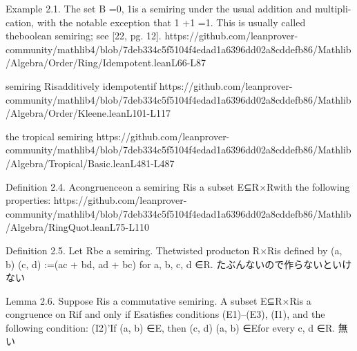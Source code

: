 %
\begin{example}
  Example 2.1. The set B ={0, 1}is a semiring under the usual addition and multipli-cation, with the notable exception that 1 +1 =1. This is usually called theboolean semiring; see [22, pg. 12].
https://github.com/leanprover-community/mathlib4/blob/7deb334c5f5104f4edad1a6396dd02a8cddefb86/Mathlib/Algebra/Order/Ring/Idempotent.leanL66-L87
\end{example}


semiring Risadditively idempotentif
https://github.com/leanprover-community/mathlib4/blob/7deb334c5f5104f4edad1a6396dd02a8cddefb86/Mathlib/Algebra/Order/Kleene.leanL101-L117



the tropical semiring
https://github.com/leanprover-community/mathlib4/blob/7deb334c5f5104f4edad1a6396dd02a8cddefb86/Mathlib/Algebra/Tropical/Basic.leanL481-L487



Definition 2.4. Acongruenceon a semiring Ris a subset E⊆R×Rwith the following properties:
https://github.com/leanprover-community/mathlib4/blob/7deb334c5f5104f4edad1a6396dd02a8cddefb86/Mathlib/Algebra/RingQuot.leanL75-L110



Definition 2.5. Let Rbe a semiring. Thetwisted producton R×Ris defined by
(a, b)  (c, d) :=(ac + bd, ad + bc)
for a, b, c, d ∈R.
たぶんないので作らないといけない



Lemma 2.6. Suppose Ris a commutative semiring. A subset E⊆R×Ris a congruence on Rif and only if Esatisfies conditions (E1)–(E3), (I1), and the following condition:
(I2)’If (a, b) ∈E, then (c, d) (a, b) ∈Efor every c, d ∈R.
無い
